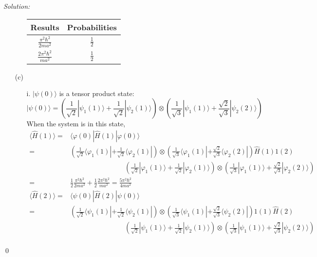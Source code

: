 \documentclass[12pt,a4paper]{article}
\newenvironment{sol}
    {\emph{Solution:}
    }
    {
    \qed
    }
\begin{document}
\begin{sol}
\begin{itemize}
\begin{itemize}
\begin{table}[h]
\centering
\begin{tabular}{|c|c|}
\hline
Results                      & Probabilities \\ \hline
$\frac{\pi^2\hbar^2}{2ma^2}$ & $\frac{1}{2}$ \\ \hline
$\frac{2\pi^2\hbar^2}{ma^2}$ & $\frac{1}{2}$ \\ \hline
\end{tabular}
\end{table}
\end{itemize}
\item[(c)]
\begin{itemize}
\item[i.] $|\psi(0)\rangle$ is a tensor product state:
\begin{equation}
|\psi(0)\rangle=\left(\frac{1}{\sqrt{2}}|\psi_1(1)\rangle+\frac{1}{\sqrt{2}}|\psi_2(1)\rangle\right)\otimes\left(\frac{1}{\sqrt{3}}|\psi_1(1)\rangle+\frac{\sqrt{2}}{\sqrt{3}}|\psi_2(2)\rangle\right)
\end{equation}
When the system is in this state,
\begin{align}
\nonumber\langle\hat{H}(1)\rangle=&\langle\varphi(0)|\hat{H}(1)|\varphi(0)\rangle\\
\nonumber=&\left(\frac{1}{\sqrt{2}}\langle\varphi_1(1)|+\frac{1}{\sqrt{2}}\langle\varphi_2(1)|\right)\otimes\left(\frac{1}{\sqrt{3}}\langle\varphi_1(1)|+\frac{\sqrt{2}}{\sqrt{3}}\langle\varphi_2(2)|\right)\hat{H}(1)1(2)\\
\nonumber&\quad\quad\quad\quad\quad\quad\quad\quad\left(\frac{1}{\sqrt{2}}|\varphi_1(1)\rangle+\frac{1}{\sqrt{2}}|\varphi_2(1)\rangle\right)\otimes\left(\frac{1}{\sqrt{3}}|\varphi_1(1)\rangle+\frac{\sqrt{2}}{\sqrt{3}}|\varphi_2(2)\rangle\right)\\
\nonumber=&\frac{1}{2}\frac{\pi^2\hbar^2}{2ma^2}+\frac{1}{2}\frac{2\pi^2\hbar^2}{ma^2}=\frac{5\pi^2\hbar^2}{4ma^2}
\end{align}
\begin{align}
\nonumber\langle\hat{H}(2)\rangle=&\langle\psi(0)|\hat{H}(2)|\psi(0)\rangle\\
\nonumber=&\left(\frac{1}{\sqrt{2}}\langle\psi_1(1)|+\frac{1}{\sqrt{2}}\langle\psi_2(1)|\right)\otimes\left(\frac{1}{\sqrt{3}}\langle\psi_1(1)|+\frac{\sqrt{2}}{\sqrt{3}}\langle\psi_2(2)|\right)1(1)\hat{H}(2)\\
\nonumber&\quad\quad\quad\quad\quad\quad\quad\quad\left(\frac{1}{\sqrt{2}}|\psi_1(1)\rangle+\frac{1}{\sqrt{2}}|\psi_2(1)\rangle\right)\otimes\left(\frac{1}{\sqrt{3}}|\psi_1(1)\rangle+\frac{\sqrt{2}}{\sqrt{3}}|\psi_2(2)\rangle\right)\\

\end{align}
\end{itemize}
\end{itemize}
\end{sol}
\end{document}
